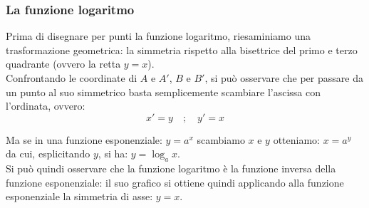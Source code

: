 \subsubsection{La funzione logaritmo}
\label{subsubsec:esplog_funzione_logaritmo}
\noindent
\begin{minipage}[]{.60\textwidth}
Prima di disegnare per punti la funzione logaritmo, riesaminiamo una 
trasformazione geometrica: la simmetria rispetto alla bisettrice del primo 
e terzo quadrante (ovvero la retta \(y=x\)).\\[7pt]
Confrontando le coordinate di \(A\) e \(A'\), \(B\) e \(B'\), si può 
osservare che per passare da un punto al suo simmetrico basta semplicemente 
scambiare l'ascissa con l'ordinata, ovvero:
\[ x'=y \quad ; \quad  y'=x\]

\end{minipage} \hspace{.04\textwidth}
\begin{minipage}[]{.35\textwidth}
\begin{center}
\begin{inaccessibleblock}
  \simmetriayx
\end{inaccessibleblock}
\end{center}
\end{minipage} 

\begin{minipage}{.35\textwidth}
\begin{center}
\begin{inaccessibleblock}[Grafico di una funzione esponenziale e 
il suo simmetrico rispetto a y=x]
  \graficologaritmica
\end{inaccessibleblock}
\end{center}
\end{minipage} \qquad
\begin{minipage}{.6\textwidth}
Ma se in una funzione esponenziale: \(y=a^x\) scambiamo \(x\) e \(y\) 
otteniamo: \(x=a^y\) da cui, esplicitando \(y\), si ha: \(y=\log_a 
x\).\\[7pt] 
Si può quindi osservare che la funzione logaritmo è la funzione inversa 
della funzione esponenziale: il suo grafico si ottiene quindi applicando 
alla funzione esponenziale la simmetria di asse: \(y=x\).
\end{minipage}

